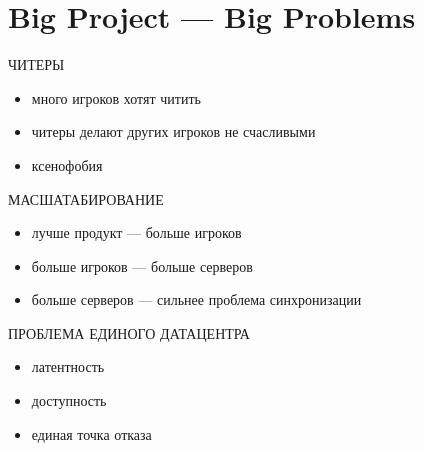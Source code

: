 \documentclass[aspectratio=169]{beamer}
\begin{document}
\section{Big Project --- Big Problems}
{
\begin{frame}[plain]{}
\end{frame}
}

\begin{frame}{ЧИТЕРЫ}
    \begin{itemize}
        \item много игроков хотят читить
        \item читеры делают других игроков не счасливыми
        \item ксенофобия
    \end{itemize}
\end{frame}

\begin{frame}{МАСШАТАБИРОВАНИЕ}
    \begin{itemize}
        \item лучше продукт --- больше игроков
        \item больше игроков --- больше серверов
        \item больше серверов --- сильнее проблема синхронизации
    \end{itemize}
\end{frame}

\begin{frame}{ПРОБЛЕМА ЕДИНОГО ДАТАЦЕНТРА}
    \begin{itemize}
        \item латентность
        \item доступность
        \item единая точка отказа
    \end{itemize}
\end{frame}
\end{document}
